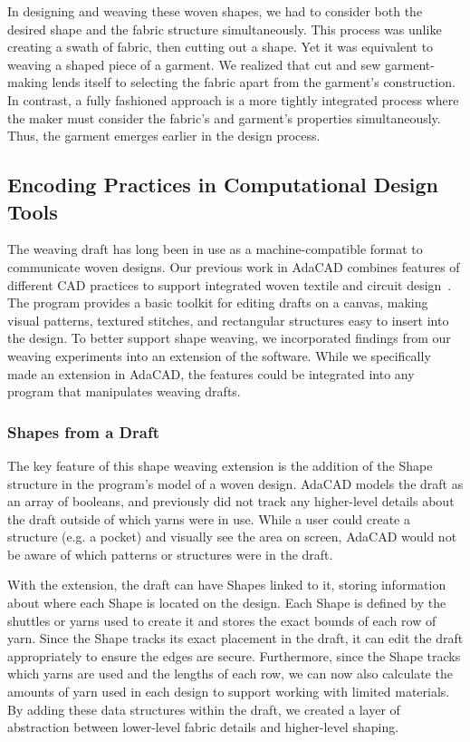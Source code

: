 In designing and weaving these woven shapes, we had to consider both the desired shape and the fabric structure simultaneously. This process was unlike creating a swath of fabric, then cutting out a shape. Yet it was equivalent to weaving a shaped piece of a garment. We realized that cut and sew garment-making lends itself to selecting the fabric apart from the garment's construction. In contrast, a fully fashioned approach is a more tightly integrated process where the maker must consider the fabric's and garment's properties simultaneously. Thus, the garment emerges earlier in the design process.

\subsection{Encoding Practices in Computational Design Tools}

The weaving draft has long been in use as a machine-compatible format to communicate woven designs. Our previous work in AdaCAD combines features of different CAD practices to support integrated woven textile and circuit design~\cite{friske_adacad:_2019}. The program provides a basic toolkit for editing drafts on a canvas, making visual patterns, textured stitches, and rectangular structures easy to insert into the design. To better support shape weaving, we incorporated findings from our weaving experiments into an extension of the software. While we specifically made an extension in AdaCAD, the features could be integrated into any program that manipulates weaving drafts.

\subsubsection{Shapes from a Draft}

The key feature of this shape weaving extension is the addition of the Shape structure in the program's model of a woven design. AdaCAD models the draft as an array of booleans, and previously did not track any higher-level details about the draft outside of which yarns were in use. While a user could create a structure (e.g. a pocket) and visually see the area on screen, AdaCAD would not be aware of which patterns or structures were in the draft.

With the extension, the draft can have Shapes linked to it, storing information about where each Shape is located on the design. Each Shape is defined by the shuttles or yarns used to create it and stores the exact bounds of each row of yarn. Since the Shape tracks its exact placement in the draft, it can edit the draft appropriately to ensure the edges are secure. Furthermore, since the Shape tracks which yarns are used and the lengths of each row, we can now also calculate the amounts of yarn used in each design to support working with limited materials. By adding these data structures within the draft, we created a layer of abstraction between lower-level fabric details and higher-level shaping.

